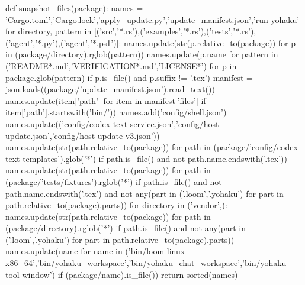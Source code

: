 def snapshot_files(package):
    names = {'Cargo.toml','Cargo.lock','apply_update.py','update_manifest.json','run-yohaku'}
    for directory, pattern in [('src','*.rs'),('examples','*.rs'),('tests','*.rs'),('agent','*.py'),('agent','*.ps1')]:
        names.update(str(p.relative_to(package)) for p in (package/directory).rglob(pattern))
    names.update(p.name for pattern in ('README*.md','VERIFICATION*.md','LICENSE*') for p in package.glob(pattern) if p.is_file() and p.suffix != '.tex')
    manifest = json.loads((package/'update_manifest.json').read_text())
    names.update(item['path'] for item in manifest['files'] if item['path'].startswith('bin/'))
    names.add('config/shell.json')
    names.update(('config/codex-text-service.json','config/host-update.json','config/host-update-v3.json'))
    names.update(str(path.relative_to(package)) for path in (package/'config/codex-text-templates').glob('*') if path.is_file() and not path.name.endswith('.tex'))
    names.update(str(path.relative_to(package)) for path in (package/'tests/fixtures').rglob('*') if path.is_file() and not path.name.endswith('.tex') and not any(part in ('.loom','.yohaku') for part in path.relative_to(package).parts))
    for directory in ('vendor',):
        names.update(str(path.relative_to(package)) for path in (package/directory).rglob('*') if path.is_file() and not any(part in ('.loom','.yohaku') for part in path.relative_to(package).parts))
    names.update(name for name in ('bin/loom-linux-x86_64','bin/yohaku_workspace','bin/yohaku_chat_workspace','bin/yohaku-tool-window') if (package/name).is_file())
    return sorted(names)


